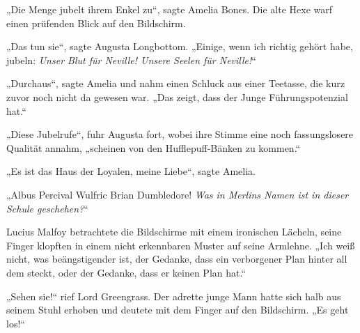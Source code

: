 „Die Menge jubelt ihrem Enkel zu“, sagte Amelia Bones. Die alte Hexe warf einen prüfenden Blick auf den Bildschirm.

„Das tun sie“, sagte Augusta Longbottom.
„Einige, wenn ich richtig gehört habe, jubeln: \emph{Unser Blut für Neville! Unsere Seelen für Neville!}“

„Durchaus“, sagte Amelia und nahm einen Schluck aus einer Teetasse, die kurz zuvor noch nicht da gewesen war.
„Das zeigt, dass der Junge Führungspotenzial hat.“

„Diese Jubelrufe“, fuhr Augusta fort, wobei ihre Stimme eine noch fassungslosere Qualität annahm, „scheinen von den Hufflepuff-Bänken zu kommen.“

„Es ist das Haus der Loyalen, meine Liebe“, sagte Amelia.

„Albus Percival Wulfric Brian Dumbledore! \emph{Was in Merlins Namen ist in dieser Schule geschehen?}“

Lucius Malfoy betrachtete die Bildschirme mit einem ironischen Lächeln, seine Finger klopften in einem nicht erkennbaren Muster auf seine Armlehne.
„Ich weiß nicht, was beängstigender ist, der Gedanke, dass ein verborgener Plan hinter all dem steckt, oder der Gedanke, dass er keinen Plan hat.“

„Sehen sie!“ rief Lord Greengrass. Der adrette junge Mann hatte sich halb aus seinem Stuhl erhoben und deutete mit dem Finger auf den Bildschirm.
„Es geht los!“

